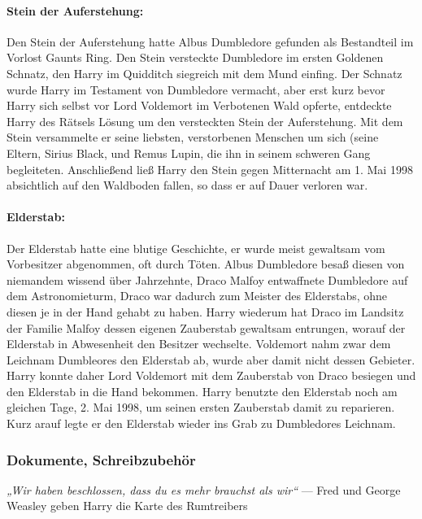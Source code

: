 \documentclass[a4paper, 10pt]{article}
\begin{document}
\paragraph{Stein der Auferstehung:}
Den Stein der Auferstehung hatte Albus Dumbledore gefunden als Bestandteil im Vorlost Gaunts Ring. Den Stein versteckte Dumbledore im ersten Goldenen Schnatz, den Harry im Quidditch siegreich mit dem Mund einfing. Der Schnatz wurde Harry im Testament von Dumbledore vermacht, aber erst kurz bevor Harry sich selbst vor Lord Voldemort im Verbotenen Wald opferte, entdeckte Harry des Rätsels Lösung um den versteckten Stein der Auferstehung. Mit dem Stein versammelte er seine liebsten, verstorbenen Menschen um sich (seine Eltern, Sirius Black, und Remus Lupin, die ihn in seinem schweren Gang begleiteten. Anschließend ließ Harry den Stein gegen Mitternacht am 1. Mai 1998 absichtlich auf den Waldboden fallen, so dass er auf Dauer verloren war.
\paragraph{Elderstab:}
Der Elderstab hatte eine blutige Geschichte, er wurde meist gewaltsam vom Vorbesitzer abgenommen, oft durch Töten. Albus Dumbledore besaß diesen von niemandem wissend über Jahrzehnte, Draco Malfoy entwaffnete Dumbledore auf dem Astronomieturm, Draco war dadurch zum Meister des Elderstabs, ohne diesen je in der Hand gehabt zu haben. Harry wiederum hat Draco im Landsitz der Familie Malfoy dessen eigenen Zauberstab gewaltsam entrungen, worauf der Elderstab in Abwesenheit den Besitzer wechselte. Voldemort nahm zwar dem Leichnam Dumbleores den Elderstab ab, wurde aber damit nicht dessen Gebieter. Harry konnte daher Lord Voldemort mit dem Zauberstab von Draco besiegen und den Elderstab in die Hand bekommen. Harry benutzte den Elderstab noch am gleichen Tage, 2. Mai 1998, um seinen ersten Zauberstab damit zu reparieren. Kurz arauf legte er den Elderstab wieder ins Grab zu Dumbledores Leichnam.

\subsubsection*{\large Dokumente, Schreibzubehör}
\textit{„Wir haben beschlossen, dass du es mehr brauchst als wir“}
\vspace{10pt}
\newline
{}  
— Fred und George Weasley geben Harry die Karte des Rumtreibers
\end{document}
